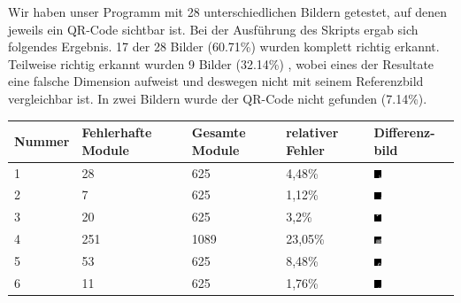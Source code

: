 \documentclass[a4paper, oneside, 12pt]{article}
\begin{document}
Wir haben unser Programm mit 28 unterschiedlichen Bildern getestet, auf denen jeweils ein QR-Code sichtbar ist. Bei der Ausführung des Skripts ergab sich folgendes Ergebnis. 17 der 28 Bilder (60.71\%) wurden komplett richtig erkannt. Teilweise richtig erkannt wurden 9 Bilder (32.14\%) , wobei eines der Resultate eine falsche Dimension aufweist und deswegen nicht mit seinem Referenzbild vergleichbar ist. In zwei Bildern wurde der QR-Code nicht gefunden (7.14\%).

\begin{table}[h]
\centering
\begin{tabular}{ | p{} | p{} | p{} | p{} | p{} |}
	\hline
    \textbf{Nummer} & \textbf{Fehlerhafte Module} & \textbf{Gesamte Module} & \textbf{relativer Fehler} & \textbf{Differenz-bild} \\
	\hline
	1 & 28 & 625 & 4,48\% & \includegraphics[width=0.1\textwidth]{images/amazon_2.png}\\
	\hline
	2 & 7 & 625 & 1,12\% & \includegraphics[width=0.1\textwidth]{images/facebook_2.png}\\
	\hline
	3 & 20 & 625 & 3,2\% & \includegraphics[width=0.1\textwidth]{images/google_2.png}\\
	\hline
	4 & 251 & 1089 & 23,05\% & \includegraphics[width=0.1\textwidth]{images/hallo_3.png}\\
	\hline
	5 & 53 & 625 & 8,48\% & \includegraphics[width=0.1\textwidth]{images/reddit_1.png}\\	
	\hline
	6 & 11 & 625 & 1,76\% & \includegraphics[width=0.1\textwidth]{images/reddit_2.png}\\	

\end{tabular}
\end{table}
\end{document}
